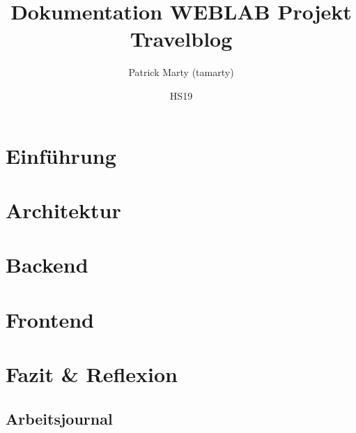 \documentclass{article}
\title{Dokumentation WEBLAB Projekt Travelblog}
\author{Patrick Marty (tamarty)}
\date{HS19}
\begin{document}
\maketitle

\vspace{2cm}
\section{Einführung}\label{einfuhrung}

\newpage

\section{Architektur}\label{architektur}


\section{Backend}\label{backend}


\section{Frontend}\label{frontend}

\section{Fazit \& Reflexion}\label{fazit}



\newpage

\begin{landscape}
\section{Arbeitsjournal}\label{arbeitsjournal}

\end{landscape}
\end{document}
